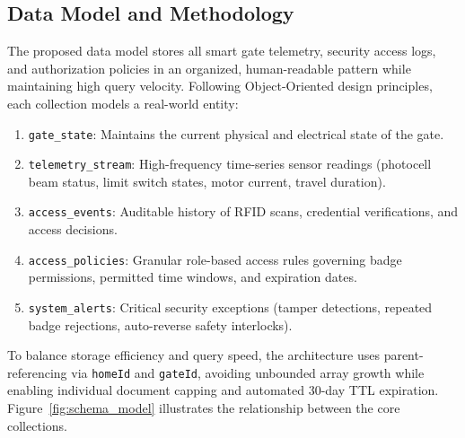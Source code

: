 \documentclass[11pt,a4paper]{article}
\begin{document}
\subsection{Data Model and Methodology}
The proposed data model stores all smart gate telemetry, security access logs, and authorization policies in an organized, human-readable pattern while maintaining high query velocity. Following Object-Oriented design principles, each collection models a real-world entity:
\begin{enumerate}[noitemsep]
    \item \texttt{gate\_state}: Maintains the current physical and electrical state of the gate.
    \item \texttt{telemetry\_stream}: High-frequency time-series sensor readings (photocell beam status, limit switch states, motor current, travel duration).
    \item \texttt{access\_events}: Auditable history of RFID scans, credential verifications, and access decisions.
    \item \texttt{access\_policies}: Granular role-based access rules governing badge permissions, permitted time windows, and expiration dates.
    \item \texttt{system\_alerts}: Critical security exceptions (tamper detections, repeated badge rejections, auto-reverse safety interlocks).
\end{enumerate}

To balance storage efficiency and query speed, the architecture uses parent-referencing via \texttt{homeId} and \texttt{gateId}, avoiding unbounded array growth while enabling individual document capping and automated 30-day TTL expiration. Figure~\ref{fig:schema_model} illustrates the relationship between the core collections.
\end{document}
